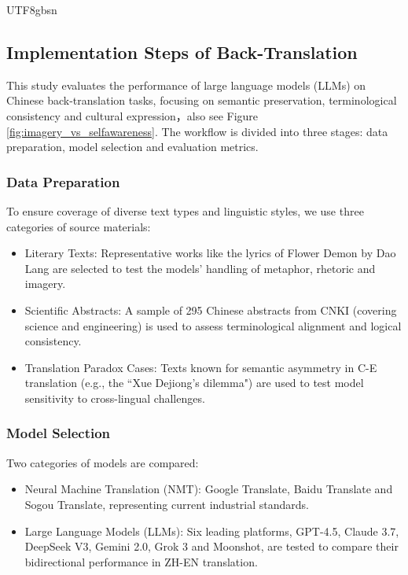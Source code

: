 \documentclass[conference]{IEEEtran}
\begin{document}
\begin{CJK}{UTF8}{gbsn}
\subsection{Implementation Steps of Back-Translation}
This study evaluates the performance of large language models (LLMs) on Chinese back-translation tasks, focusing on semantic preservation, terminological consistency and cultural expression，also see Figure \ref{fig:imagery_vs_selfawareness}. The workflow is divided into three stages: data preparation, model selection and evaluation metrics.

\subsubsection{Data Preparation}
To ensure coverage of diverse text types and linguistic styles, we use three categories of source materials:
\begin{itemize}
\item Literary Texts: Representative works like the lyrics of Flower Demon by Dao Lang are selected to test the models’ handling of metaphor, rhetoric and imagery.

\item Scientific Abstracts: A sample of 295 Chinese abstracts from CNKI (covering science and engineering) is used to assess terminological alignment and logical consistency.

\item Translation Paradox Cases: Texts known for semantic asymmetry in C-E translation (e.g., the ``Xue Dejiong’s dilemma") are used to test model sensitivity to cross-lingual challenges.
 
\end{itemize}

\subsubsection{ Model Selection}
Two categories of models are compared:
\begin{itemize}
   
 \item Neural Machine Translation (NMT): Google Translate, Baidu Translate and Sogou Translate, representing current industrial standards.

 \item Large Language Models (LLMs): Six leading platforms, GPT-4.5, Claude 3.7, DeepSeek V3, Gemini 2.0, Grok 3 and Moonshot, are tested to compare their bidirectional performance in ZH-EN translation.
 

\end{itemize}
\end{CJK}
\end{document}

